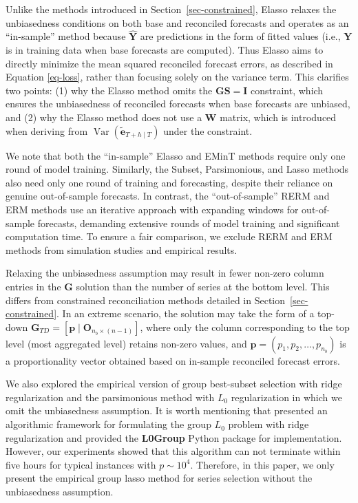 \documentclass[
  11pt]{article}
\theoremstyle{plain}
\theoremstyle{remark}
\begin{document}
Unlike the methods introduced in Section~\ref{sec-constrained}, Elasso
relaxes the unbiasedness conditions on both base and reconciled
forecasts and operates as an ``in-sample'' method because
\(\hat{\bm{Y}}\) are predictions in the form of fitted values (i.e.,
\(\bm{Y}\) is in training data when base forecasts are computed). Thus
Elasso aims to directly minimize the mean squared reconciled forecast
errors, as described in Equation \eqref{eq-loss}, rather than focusing
solely on the variance term. This clarifies two points: (1) why the
Elasso method omits the \(\bm{GS}=\bm{I}\) constraint, which ensures the
unbiasedness of reconciled forecasts when base forecasts are unbiased,
and (2) why the Elasso method does not use a \(\bm{W}\) matrix, which is
introduced when deriving from
\(\operatorname{Var}(\tilde{\bm{e}}_{T+h \mid T})\) under the
constraint.

We note that both the ``in-sample'' Elasso and EMinT methods require
only one round of model training. Similarly, the Subset, Parsimonious,
and Lasso methods also need only one round of training and forecasting,
despite their reliance on genuine out-of-sample forecasts. In contrast,
the ``out-of-sample'' RERM and ERM methods use an iterative approach
with expanding windows for out-of-sample forecasts, demanding extensive
rounds of model training and significant computation time. To ensure a
fair comparison, we exclude RERM and ERM methods from simulation studies
and empirical results.

Relaxing the unbiasedness assumption may result in fewer non-zero column
entries in the \(\bm{G}\) solution than the number of series at the
bottom level. This differs from constrained reconciliation methods
detailed in Section~\ref{sec-constrained}. In an extreme scenario, the
solution may take the form of a top-down
\(\bm{G}_{TD}=[\bm{p} \mid \bm{O}_{n_b \times (n-1)}]\), where only the
column corresponding to the top level (most aggregated level) retains
non-zero values, and \(\bm{p} = (p_1, p_2, \ldots, p_{n_b})\) is a
proportionality vector obtained based on in-sample reconciled forecast
errors.

We also explored the empirical version of group best-subset selection
with ridge regularization and the parsimonious method with \(L_0\)
regularization in which we omit the unbiasedness assumption. It is worth
mentioning that \citet{Hazimeh2023-ie} presented an algorithmic
framework for formulating the group \(L_0\) problem with ridge
regularization and provided the \textbf{L0Group} Python package for
implementation. However, our experiments showed that this algorithm can
not terminate within five hours for typical instances with
\(p \sim 10^4\). Therefore, in this paper, we only present the empirical
group lasso method for series selection without the unbiasedness
assumption.
\end{document}

